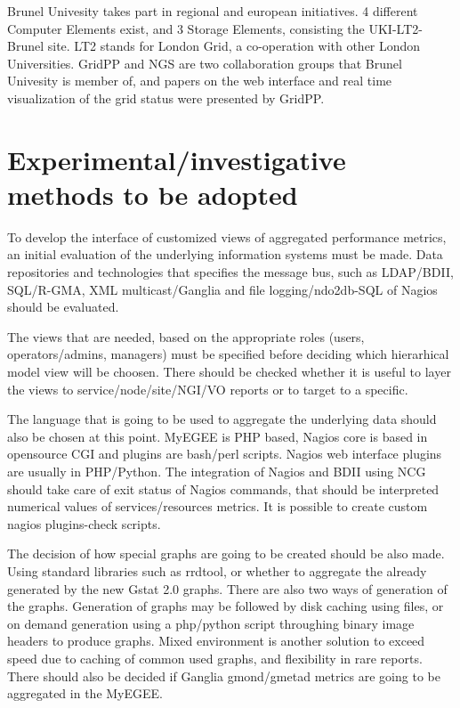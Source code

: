 \documentclass[a4paper,12pt,oneside]{book}
\begin{document}
Brunel Univesity takes part in regional and european initiatives. 4 different
Computer Elements exist, and 3 Storage Elements, consisting the UKI-LT2-Brunel
site. LT2 stands for London Grid, a co-operation with other London Universities.
GridPP and NGS are two collaboration groups that Brunel Univesity is member of,
and papers on the web interface \cite{Hobson2007} and real time visualization of
the grid status were presented \cite{Huang2007} by GridPP.

\section[Experimental]{Experimental/investigative methods to be adopted}

To develop the interface of customized views of aggregated performance metrics,
an initial evaluation of the underlying information systems must be made. Data
repositories and technologies that specifies the message bus, such as LDAP/BDII,
SQL/R-GMA, XML multicast/Ganglia and file logging/ndo2db-SQL of Nagios should be
evaluated. 

The views that are needed, based on the appropriate roles (users,
operators/admins, managers) must be specified before deciding which hierarhical
model view will be choosen. There should be checked whether it is useful to
layer the views to service/node/site/NGI/VO reports or to target to a specific.

The language that is going to be used to aggregate the underlying data should
also be chosen at this point. MyEGEE is PHP  based, Nagios core is based in
opensource CGI and plugins are bash/perl scripts. Nagios web interface plugins
are usually in PHP/Python. The integration of Nagios and BDII using NCG should
take care of exit status of Nagios commands, that should be interpreted
numerical values of services/resources metrics. It is possible to create custom
nagios plugins-check scripts. 

The decision of how special graphs are going to be
created should be also made. Using standard libraries such as rrdtool, or
whether to aggregate the already generated by the new Gstat 2.0 graphs.
There are also two ways of generation of the graphs. Generation of graphs may be
followed by disk caching using files, or on demand generation using a php/python
script throughing binary image headers to produce graphs. Mixed environment is
another solution to exceed speed due to caching of common used graphs, and
flexibility in rare reports. There should also be decided if Ganglia
gmond/gmetad metrics are going to be aggregated in the MyEGEE. 
\end{document}
